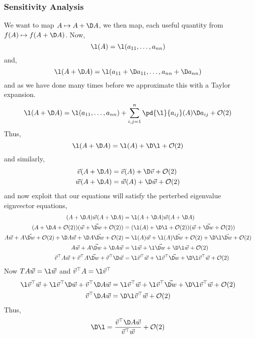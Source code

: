 \subsubsection{Sensitivity Analysis}
We want to map $A \mapsto A + \D A$, we then map, each useful quantity from $f(A) \mapsto f(A + \D A)$. Now,
$$ \l(A) = \l(a_{11}, \dots, a_{nn}) $$
and,
$$ \l(A+ \D A) = \l(a_{11} + \D a_{11}, \dots, a_{nn} + \D a_{nn}) $$
and as we have done many times before we approximate this with a Taylor expansion.
\begin{align*}
  \l(A + \D A) = \l(a_{11}, \dots, a_{nn}) + \sum_{i, j = 1}^n \pd{\l}{a_{ij}}(A)\D a_{ij} + \mathcal{O}(2)
\end{align*}
Thus,
$$ \l(A + \D A) = \l(A) + \D\l + \mathcal{O}(2) $$
and similarly,
\begin{align*}
  \vec v (A + \D A) &= \vec v(A) + \D\vec v + \mathcal{O}(2)\\
  \vec w (A + \D A) &= \vec w(A) + \D\vec w + \mathcal{O}(2)\\
\end{align*}
and now exploit that our equations will satisfy the perterbed eigenvalue eignvector equations,
\begin{align*}
  (A + \D A)\vec w(A + \D A) &= \l(A + \D A)\vec w(A + \D A)\\
  (A + \D A + \mathcal{O}(2))(\vec w + \vec{ \D w} + \mathcal{O}(2)) &= (\l(A) + \D\l + \mathcal{O}(2))(\vec w + \vec{\D w} + \mathcal{O}(2))\\
  A\vec w + A\vec{\D w} + \mathcal{O}(2) + \D A\vec w + \D A\vec{\D w} + \mathcal{O}(2) &= \l(A)\vec w + \l(A)\vec{\D w} + \mathcal{O}(2) + \D\l\vec{\D w} + \mathcal{O}(2) \\
  A\vec w + A\vec{\D w} + \D A\vec w &= \l\vec w + \l\vec{\D w} + \D\l\vec{w} + \mathcal{O}(2) \\
  \vec v^\top A\vec w + \vec v^\top A\vec{\D w} + \vec v^\top\D \vec w &= \l\vec v^\top\vec w + \l\vec v^\top\vec{\D w} + \D\l\vec v^\top\vec{w} + \mathcal{O}(2)
\end{align*}
Now $TA\vec w = \l\vec w$ and $\vec v^\top A = \l\vec v^\top $
\begin{align*}
  \l\vec v^\top\vec w + \l\vec v^\top \D\vec{ w} + \vec v^\top\D A\vec w &= \l\vec v^\top\vec w + \l\vec v^\top\vec{\D w} + \D\l\vec v^\top\vec{w} + \mathcal{O}(2) \\
  \vec v^\top\D A\vec w &=\D\l\vec v^\top\vec{w} + \mathcal{O}(2)
\end{align*}
Thus,
$$ \D\l = \frac{\vec v^\top\D A\vec w}{\vec v^\top \vec w} + \mathcal{O}(2) $$
